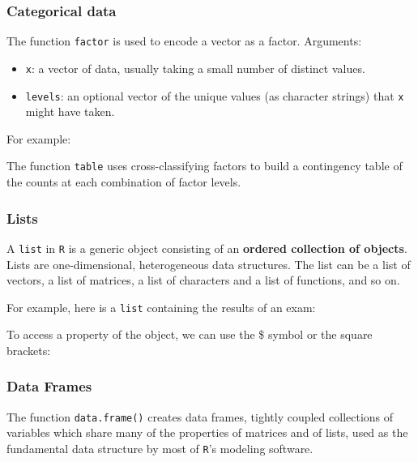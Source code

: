 \documentclass[a4paper]{article}
\newcommand{\highspace}{\vspace{1.2em}\noindent}
\begin{document}
    \subsubsection{Categorical data}

    The function \texttt{factor} is used to encode a vector as a factor. Arguments:
    \begin{itemize}
        \item \texttt{x}: a vector of data, usually taking a small number of distinct values.
        \item \texttt{levels}: an optional vector of the unique values (as character strings) that \texttt{x} might have taken.
    \end{itemize}
    For example:
    
    The function \texttt{table} uses cross-classifying factors to build a contingency table of the counts at each combination of factor levels.
    

    \newpage

    \subsubsection{Lists}

    A \texttt{list} in \texttt{R} is a generic object consisting of an \textbf{ordered collection of objects}. Lists are one-dimensional, heterogeneous data structures. The list can be a list of vectors, a list of matrices, a list of characters and a list of functions, and so on.

    \highspace
    For example, here is a \texttt{list} containing the results of an exam:
    
    To access a property of the object, we can use the \$ symbol or the square brackets:
    

    \newpage

    \subsubsection{Data Frames}

    The function \texttt{data.frame()} creates data frames, tightly coupled collections of variables which share many of the properties of matrices and of lists, used as the fundamental data structure by most of \texttt{R}'s modeling software.
\end{document}

